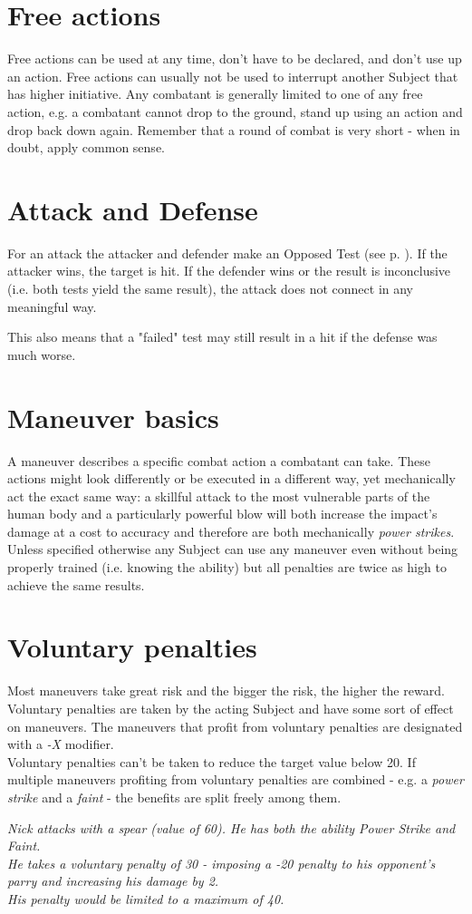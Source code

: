 \section{Free actions}
Free actions can be used at any time, don't have to be declared, and don't use up an action.
Free actions can usually not be used to interrupt another Subject that has higher initiative.
Any combatant is generally limited to one of any free action,
	e.g. a combatant cannot drop to the ground,
	stand up using an action and drop back down again.
Remember that a round of combat is very short - when in doubt, apply common sense.
\section{Attack and Defense}
For an attack the attacker and defender make an Opposed Test (see p. \pageref{sec:opposedchecks}).
If the attacker wins, the target is hit.
If the defender wins or the result is inconclusive (i.e. both tests yield the same result),
	the attack does not connect in any meaningful way.
\par
This also means that a "failed" test may still result in a hit if the defense was much worse.
\section{Maneuver basics}
A maneuver describes a specific combat action a combatant can take.
These actions might look differently or be executed in a different way,
	yet mechanically act the exact same way:
	a skillful attack to the most vulnerable parts of the human body
	and a particularly powerful blow
	will both increase the impact’s damage
	at a cost to accuracy
	and therefore are both mechanically \textit{power strikes}.\\
Unless specified otherwise
	any Subject can use any maneuver
	even without being properly trained (i.e. knowing the ability)
	but all penalties are twice as high to achieve the same results.
\section{Voluntary penalties}
Most maneuvers take great risk and the bigger the risk, the higher the reward.
Voluntary penalties are taken by the acting Subject
	and have some sort of effect on maneuvers.
The maneuvers that profit from voluntary penalties are designated with a \emph{-X} modifier.
\\%
Voluntary penalties can’t be taken to reduce the target value below 20. If multiple maneuvers profiting from voluntary penalties are combined - e.g. a \emph{power strike} and a \emph{faint} - the benefits are split freely among them.
\begin{exampleblock}
	\itshape
	Nick attacks with a spear (value of 60). He has both the ability Power Strike and Faint.\\
	He takes a voluntary penalty of 30 - imposing a -20 penalty to his opponent's parry and increasing his damage by 2.\\
	His penalty would be limited to a maximum of 40.
\end{exampleblock}


